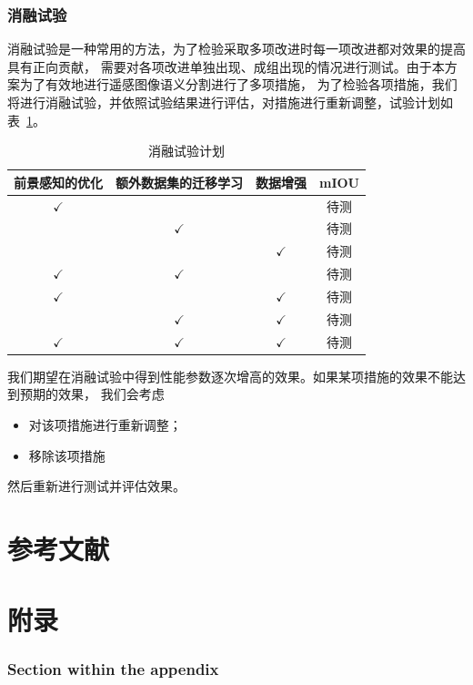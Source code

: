 \documentclass[a4paper,twoside,zihao=5,UTF8]{ctexrep}
\begin{document}
\section{消融试验}

消融试验是一种常用的方法，为了检验采取多项改进时每一项改进都对效果的提高具有正向贡献，
需要对各项改进单独出现、成组出现的情况进行测试。由于本方案为了有效地进行遥感图像语义分割进行了多项措施，
为了检验各项措施，我们将进行消融试验，并依照试验结果进行评估，对措施进行重新调整，试验计划如表~\ref{tbl:ablexpr}。

\begin{table}[htbp]
    \centering
    \caption{消融试验计划}
    \label{tbl:ablexpr}
    \renewcommand\arraystretch{1.5}
    \begin{tabular}{ccc|c}
        \toprule
        \hline
        前景感知的优化 & 额外数据集的迁移学习 & 数据增强 & mIOU\\
        \hline
        $\checkmark$ & \ & \ & 待测 \\
        \ & $\checkmark$ & \ & 待测  \\
        \ & \ & $\checkmark$ & 待测  \\
        $\checkmark$ & $\checkmark$ & \ & 待测  \\
        $\checkmark$ & \ & $\checkmark$ & 待测  \\
        \ & $\checkmark$ & $\checkmark$ & 待测  \\
        $\checkmark$ & $\checkmark$ & $\checkmark$ & 待测 \\
        \hline
        \bottomrule
    \end{tabular}
\end{table}

我们期望在消融试验中得到性能参数逐次增高的效果。如果某项措施的效果不能达到预期的效果，
我们会考虑
\begin{itemize}
    \item 对该项措施进行重新调整；
    \item 移除该项措施
\end{itemize}
然后重新进行测试并评估效果。

\part*{参考文献}




\appendix
\part*{附录}

\section*{Section within the appendix}
\blindtext
\end{document}
